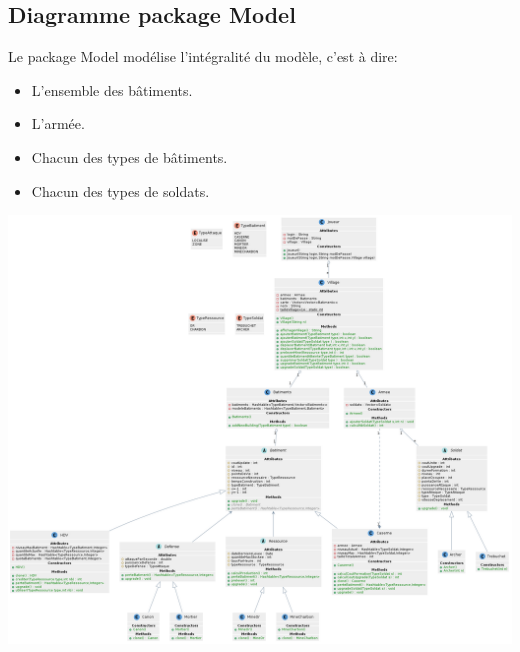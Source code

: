         \subsection{Diagramme package Model}
            Le package Model modélise l'intégralité du modèle, c'est à dire:
            \begin{itemize}
                \item L'ensemble des bâtiments.
                \item L'armée.
                \item Chacun des types de bâtiments.
                \item Chacun des types de soldats.
            \end{itemize}
            \includegraphics[scale=0.3]{ressources/images/ClassesModel.png}
